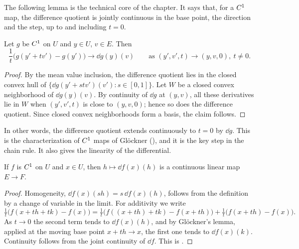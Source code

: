 The following lemma is the technical core of the chapter. It says that, for a $C^{1}$ map, the
difference quotient is jointly continuous in the base point, the direction and the step, up to
and including $t = 0$.

\begin{lemma}[Glöckner]
  \label{lem:glockner}
  \leanok
  Let $g$ be $C^{1}$ on $U$ and $y \in U$, $v \in E$. Then
  \[
    \frac{1}{t}\bigl(g(y' + t v') - g(y')\bigr) \longrightarrow \dd g(y)(v)
    \qquad \text{as } (y', v', t) \to (y, v, 0),\ t \neq 0 .
  \]
\end{lemma}

\begin{proof}
  \leanok
  By the mean value inclusion, the difference quotient lies in the closed convex hull of
  $\{\dd g(y' + s t v')(v') : s \in [0,1]\}$. Let $W$ be a closed convex neighborhood of
  $\dd g(y)(v)$. By continuity of $\dd g$ at $(y, v)$, all these derivatives lie in $W$ when
  $(y', v', t)$ is close to $(y, v, 0)$; hence so does the difference quotient. Since closed
  convex neighborhoods form a basis, the claim follows.
\end{proof}

In other words, the difference quotient extends continuously to $t = 0$ by $\dd g$. This is the
characterization of $C^{1}$ maps of Glöckner \cite{Glo02} (\cite[1.2.10]{GN26}), and it is the key
step in the chain rule. It also gives the linearity of the differential.

\begin{theorem}
  \label{thm:linear}
  \leanok
  If $f$ is $C^{1}$ on $U$ and $x \in U$, then $h \mapsto \dd f(x)(h)$ is a continuous linear
  map $E \to F$.
\end{theorem}

\begin{proof}
  \leanok
  Homogeneity, $\dd f(x)(sh) = s\, \dd f(x)(h)$, follows from the definition by a change of
  variable in the limit. For additivity we write
  \[
    \tfrac{1}{t}\bigl(f(x + th + tk) - f(x)\bigr)
    = \tfrac{1}{t}\bigl(f((x + th) + tk) - f(x + th)\bigr)
      + \tfrac{1}{t}\bigl(f(x + th) - f(x)\bigr) .
  \]
  As $t \to 0$ the second term tends to $\dd f(x)(h)$, and by Glöckner's lemma, applied at the
  moving base point $x + th \to x$, the first one tends to $\dd f(x)(k)$. Continuity follows from
  the joint continuity of $\dd f$. This is \cite[1.2.11]{GN26}.
\end{proof}

